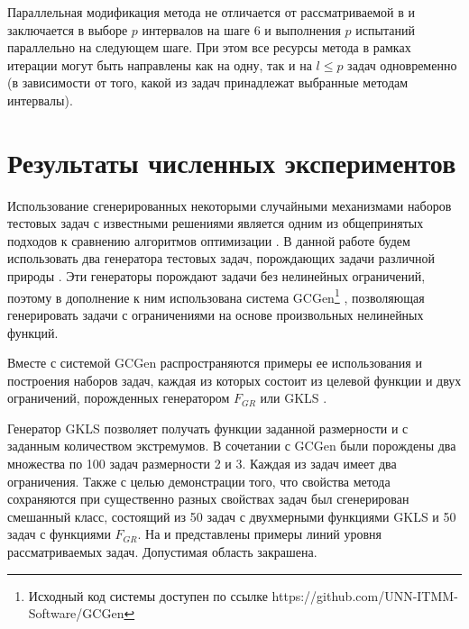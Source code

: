 \documentclass{cmi}
\begin{document}
Параллельная модификация метода не отличается от рассматриваемой в \cite{BarkalovStrongin2018}
и заключается в выборе \(p\) интервалов на шаге 6 и выполнения \(p\) испытаний параллельно
на следующем шаге. При этом все ресурсы метода в рамках итерации могут быть направлены как на одну, так и
на \(l\leqslant p\) задач одновременно (в зависимости от того, какой из задач принадлежат выбранные методам интервалы).

\section{Результаты численных экспериментов}
\label{sec:exps}

Использование сгенерированных некоторыми случайными механизмами
наборов тестовых задач с известными решениями является одним из общепринятых подходов
к сравнению алгоритмов оптимизации \cite{Beiranvand2017}. В данной работе
будем использовать два генератора тестовых задач, порождающих задачи различной природы \cite{grishaginClass, Gaviano2003}.
Эти генераторы порождают задачи без нелинейных ограничений, поэтому в дополнение к ним использована
система GCGen\footnote{Исходный код системы доступен по ссылке https://github.com/UNN-ITMM-Software/GCGen} \cite{GergelBarkalov2019}, позволяющая генерировать задачи с ограничениями на основе произвольных нелинейных
функций.

Вместе с системой GCGen распространяются примеры ее использования и построения
наборов задач, каждая из которых состоит из целевой функции и двух ограничений,
порожденных генератором \(F_{GR}\) \cite{grishaginClass} или GKLS \cite{Gaviano2003}.


Генератор GKLS \cite{Gaviano2003} позволяет получать функции заданной размерности и с заданным количеством экстремумов.
В сочетании с GCGen были порождены два множества по 100 задач размерности 2 и 3. Каждая из задач имеет два ограничения.
Также с целью демонстрации того, что свойства метода сохраняются при существенно разных свойствах задач
был сгенерирован смешанный класс, состоящий из 50 задач с двухмерными функциями GKLS и 50 задач с функциями \(F_{GR}\).
На  и  представлены примеры линий уровня рассматриваемых задач. Допустимая область закрашена.
\end{document}
